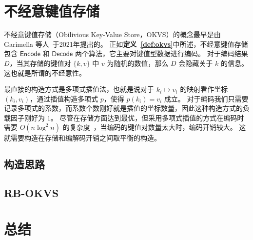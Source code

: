 \section{不经意键值存储}

不经意键值存储（Obilivious Key-Value Store，OKVS）的概念最早是由 Garimella 等人~\cite{garimella2021oblivious}于2021年提出的。
正如\textbf{定义~\ref{def:okvs}}中所述，不经意键值存储包含 $\mathsf{Encode}$ 和 $\mathsf{Decode}$ 两个算法，它主要对键值型数据进行编码。
对于编码结果 $D$，当其存储的键值对 $\{k, v\}$ 中 $v$ 为随机的数值，那么 $D$ 会隐藏关于 $k$ 的信息。
这也就是所谓的不经意性。

最直接的构造方式是多项式插值法，也就是说对于 $k_i \mapsto v_i$ 的映射看作坐标 $(k_i, v_i)$，通过插值构造多项式 $p$，使得 $p(k_i) = v_i$ 成立。
对于编码我们只需要记录多项式的系数，而系数个数刚好就是插值的坐标数量，因此这种构造方式的负载因子刚好为 $1$。
尽管在存储方面达到最优，但采用多项式插值的方式在编码时需要 $O(n\log^2n)$ 的复杂度~\cite{moenck1972Fast}，当编码的键值对数量太大时，编码开销较大。
这就需要构造在存储和编解码开销之间取平衡的构造。

\subsection{构造思路}



\subsection{RB-OKVS}

\section{总结}
